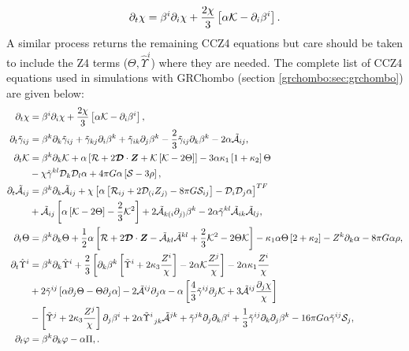\begin{equation}
\partial_t \chi =  \beta^i \partial_i \chi + \frac{2\chi}{3} \left[\alpha \mathcal{K} - \partial_i \beta^i \right].
\end{equation}
A similar process returns the remaining CCZ4 equations but care should be taken to include the Z4 terms ($\Theta,\hat{\Upsilon}^i$) where they are needed. The complete list of CCZ4 equations used in simulations with GRChombo (section \ref{grchombo:sec:grchombo}) are given below:
\begin{align} \partial_t \chi &=  \beta^i \partial_i \chi + \frac{2\chi}{3} \left[\alpha \mathcal{K} - \partial_i \beta^i \right],\\
\partial_t\tilde{\gamma}_{ij} &=  \beta^k\partial_k\tilde{\gamma}_{ij}  + \tilde{\gamma}_{kj}\partial_i \beta^k + \tilde{\gamma}_{ik}\partial_j\beta^k - \frac{2}{3}\tilde{\gamma}_{ij} \partial_k \beta^k - 2\alpha\tilde{\mathcal{A}}_{ij},\\
\partial_t\mathcal{K} &=  \beta^k\partial_k\mathcal{K} + \alpha\left[ \mathcal{R} + 2\boldsymbol{\mathcal{D}}\cdot \boldsymbol{Z} + \mathcal{K}\left[ \mathcal{K}-2\Theta\right]\right] - 3\alpha \kappa_1\left[ 1+\kappa_2\right]\Theta \nonumber\\
&-\chi\tilde{\gamma}^{kl}\mathcal{D}_k\mathcal{D}_l\alpha + 4\pi G\alpha\left[ \mathcal{S} - 3\rho\right], \\
\partial_t\tilde{\mathcal{A}}_{ij} &=  \beta^k \partial_k \tilde{\mathcal{A}}_{ij}+\chi\left[\alpha\left[\mathcal{R}_{ij} + 2\mathcal{D}_{(i}Z_{j)}-8\pi G \mathcal{S}_{ij} \right] -\mathcal{D}_i\mathcal{D}_j\alpha \right]^{TF}\nonumber\\
& +\tilde{\mathcal{A}}_{ij}\left[ \alpha\left[ \mathcal{K}-2\Theta\right]-\frac{2}{3}\mathcal{K}^2\right] + 2\tilde{\mathcal{A}}_{k(i}\partial_{j)}\beta^k -2\alpha\tilde{\gamma}^{kl}\tilde{\mathcal{A}}_{ik}\tilde{\mathcal{A}}_{lj},\\
\partial_t\Theta &= \beta^k\partial_k \Theta + \frac{1}{2}\alpha\left[ \mathcal{R} + 2\boldsymbol{\mathcal{D}}\cdot \boldsymbol{Z} - \tilde{\mathcal{A}}_{kl} \tilde{\mathcal{A}}^{kl} + \frac{2}{3}\mathcal{K}^2 - 2\Theta\mathcal{K}\right] -\kappa_1\alpha\Theta\left[ 2+\kappa_2\right] - Z^k\partial_k\alpha - 8\pi G \alpha \rho, \\
\partial_t\hat{\Upsilon}^i &=  \beta^k \partial_k \hat{\Upsilon}^i + \frac{2}{3}\left[ \partial_k \beta^k \left[ \tilde{\Upsilon}^i+2\kappa_3 \frac{Z^{i}}{\chi}\right]-2\alpha\mathcal{K}\frac{Z^j}{\chi}\right]-2\alpha\kappa_1\frac{Z^i}{\chi}\nonumber \\
& + 2\tilde{\gamma}^{ij}\left[ \alpha\partial_j\Theta -\Theta \partial_j\alpha \right] -2\tilde{\mathcal{A}}^{ij}\partial_j\alpha - \alpha\left[ \frac{4}{3}\tilde{\gamma}^{ij}\partial_j\mathcal{K} + 3\tilde{\mathcal{A}}^{ij}\frac{\partial_j \chi}{\chi}\right]\nonumber\\
& -\left[ \tilde{\Upsilon}^j + 2\kappa_3 \frac{Z^j}{\chi}\right]\partial_j \beta^i + 2\alpha \tilde{\Upsilon}^i_{\,\,\,jk}\tilde{\mathcal{A}}^{jk} + \tilde{\gamma}^{jk}\partial_j\partial_k \beta^i + \frac{1}{3} \tilde{\gamma}^{ij}\partial_k \partial_j \beta^k - 16\pi G \alpha \tilde{\gamma}^{ij}\mathcal{S}_j, \\
\partial_t \varphi &= \beta^k\partial_k \varphi - \alpha\Pi ,\label{nr:eq:ccz4kg1}.\end{align}
